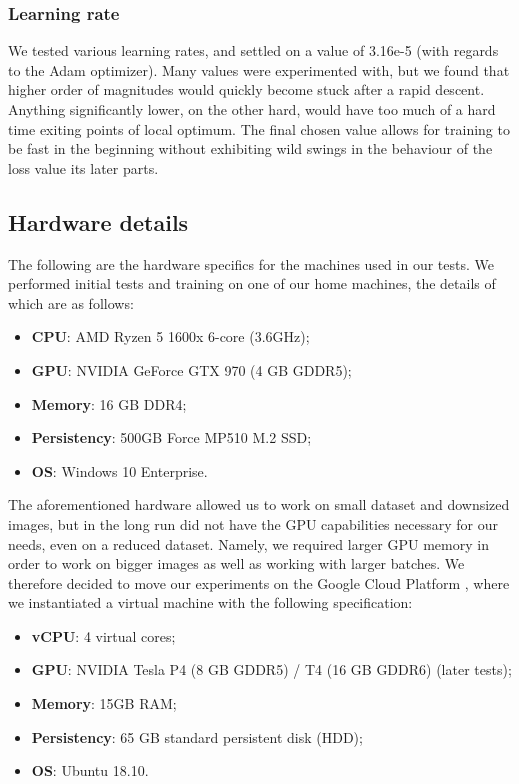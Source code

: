 \documentclass[twoside,twocolumn]{article}
\begin{document}
\subsubsection{Learning rate}
We tested various learning rates, and settled on a value of  3.16e-5 (with regards to the Adam optimizer). Many values were experimented with, but we found that higher order of magnitudes would quickly become stuck after a rapid descent. Anything significantly lower, on the other hard, would have too much of a hard time exiting points of local optimum.
The final chosen value allows for training to be fast in the beginning without exhibiting wild swings in the behaviour of the loss value its later parts.


\subsection{Hardware details}

The following are the hardware specifics for the machines used in our tests. We performed initial tests and training on one of our home machines, the details of which are as follows:
\begin{itemize}
\item \textbf{CPU}: AMD Ryzen 5 1600x  6-core (3.6GHz);
\item \textbf{GPU}: NVIDIA GeForce GTX 970 (4 GB GDDR5);
\item \textbf{Memory}: 16 GB DDR4;
\item \textbf{Persistency}: 500GB Force MP510 M.2 SSD;
\item \textbf{OS}: Windows 10 Enterprise.
\end{itemize}

The aforementioned hardware allowed us to work on small dataset and downsized images, but in the long run did not have the GPU capabilities necessary for our needs, even on a reduced dataset. Namely, we required larger GPU memory in order to work on bigger images as well as working with larger batches. We therefore decided to move our experiments on the Google Cloud Platform \cite{GCP}, where we instantiated a virtual machine with the following specification:

\begin{itemize}
	\item \textbf{vCPU}: 4 virtual cores;
	\item \textbf{GPU}: NVIDIA Tesla P4 (8 GB GDDR5) / T4 (16 GB GDDR6) (later tests);
	\item \textbf{Memory}: 15GB RAM;
	\item \textbf{Persistency}: 65 GB standard persistent disk (HDD);
	\item \textbf{OS}: Ubuntu 18.10.
\end{itemize}
\end{document}
